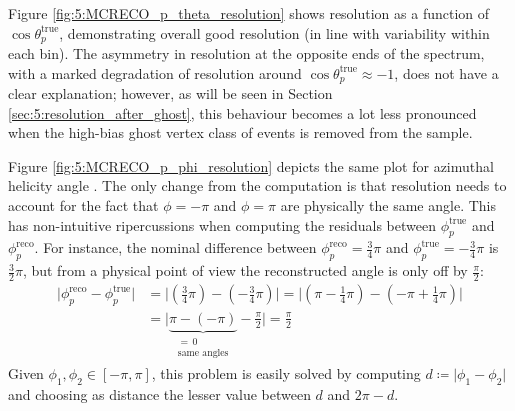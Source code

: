 Figure \ref{fig:5:MCRECO_p_theta_resolution} shows \cthetap resolution as a function of $\cos\theta_p^\text{true}$, demonstrating overall good resolution (in line with \cthetap variability within each bin).
The asymmetry in resolution at the opposite ends of the \cthetap spectrum, with a marked degradation of resolution around $\cos\theta_p^\text{true} \approx -1$, does not have a clear explanation;
however, as will be seen in Section \ref{sec:5:resolution_after_ghost}, this behaviour becomes a lot less pronounced when the high-bias ghost vertex class of events is removed from the sample.

Figure \ref{fig:5:MCRECO_p_phi_resolution} depicts the same plot for azimuthal helicity angle \phip.
The only change from the \cthetap computation is that \phip resolution needs to account for the fact that $\phi=-\pi$ and $\phi=\pi$ are physically the same angle.
This has non-intuitive ripercussions when computing the residuals between $\phi_p^\text{true}$ and $\phi_p^\text{reco}$.
For instance, the nominal difference between $\phi_p^\text{reco}=\frac{3}{4}\pi$ and $\phi_p^\text{true}=-\frac{3}{4}\pi$ is $\frac{3}{2}\pi$, but from a physical point of view the reconstructed angle is only off by $\frac{\pi}{2}$:
\begin{equation}
\begin{aligned}
\lvert
\phi_p^\text{reco} - \phi_p^\text{true}
\rvert
&=
\bigg|
\left( \frac{3}{4}\pi \right)
-
\left(- \frac{3}{4}\pi \right)
\bigg|
=
\bigg|
\left(\pi - \frac{1}{4}\pi \right)
-
\left(-\pi + \frac{1}{4}\pi \right)
\bigg| \\
&=
\bigg|
\underbrace{\pi - \left( -\pi \right)}_{\substack{=\,0 \\ \text{same angles}}}
- \frac{\pi}{2}
\bigg|
= \frac{\pi}{2}
\end{aligned}
\end{equation}
Given $\phi_1, \phi_2 \in [-\pi, \pi]$, this problem is easily solved by computing  $d \coloneqq \lvert \phi_1 - \phi_2 \rvert$ and choosing as distance the lesser value between $d$ and $2\pi-d$.


